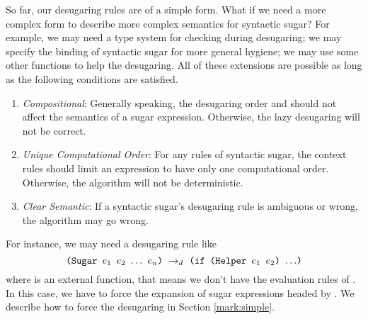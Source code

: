 So far, our desugaring rules are of a simple form. What if we need a more complex form to describe more complex semantics for syntactic sugar? For example, we may need a type system for checking during desugaring; we may specify the binding of syntactic sugar for more general hygiene; we may use some other functions to help the desugaring. All of these extensions are possible as long as the following conditions are satisfied.
\begin{enumerate}
	\item \emph{Compositional}: Generally speaking, the desugaring order and should not affect the semantics of a sugar expression. Otherwise, the lazy desugaring will not be correct.
	\item \emph{Unique Computational Order}: For any rules of syntactic sugar, the context rules should limit an expression to have only one computational order. Otherwise, the algorithm  will not be deterministic.
	\item \emph{Clear Semantic}: If a syntactic sugar's desugaring rule is ambiguous or wrong, the algorithm  may go wrong.
\end{enumerate}

For instance, we may need a desugaring rule like
\[
\texttt{(Sugar $e_1$ $e_2$ $\ldots$ $e_n$)} ~\rightarrow_d~ \texttt{(if (Helper $e_1$ $e_2$) $\ldots$)}
\]
where  is an external function, that means we don't have the evaluation rules of . In this case, we have to force the expansion of sugar expressions headed by . We describe how to force the desugaring in Section \ref{mark:simple}.
